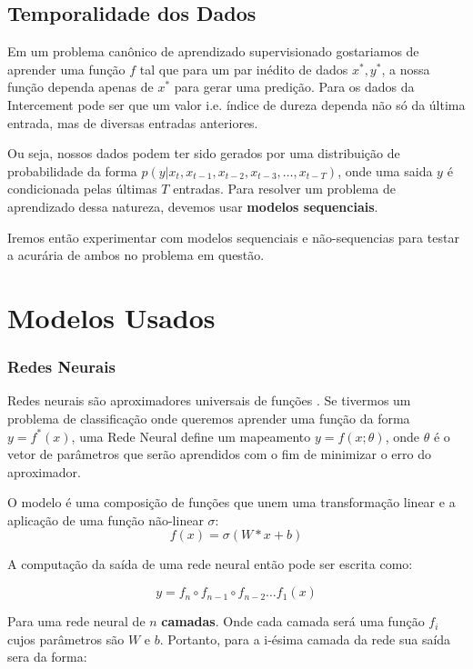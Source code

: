 
\subsection{Temporalidade dos Dados}

Em um problema canônico de aprendizado supervisionado gostariamos de aprender
uma função $f$ tal que para um par inédito de dados $x^*,y^*$, a nossa função
dependa apenas de $x^*$ para gerar uma predição. Para os dados da Intercement pode ser que um valor i.e. índice de dureza dependa não só da última entrada, mas de diversas entradas anteriores. 

Ou seja, nossos dados podem ter sido gerados por uma distribuição de probabilidade da forma $p(y | x_{t} ,x_{t -1},x_{t -2},x_{t-3} , \dots, x_{t-T})$, onde uma saida $y$ é condicionada pelas últimas $T$ entradas. Para resolver um problema de aprendizado dessa natureza, devemos usar \textbf{modelos sequenciais}. 

Iremos então experimentar com modelos sequenciais e não-sequencias para testar a acurária de ambos no problema em questão.


\section{Modelos Usados} 

\subsubsection{Redes Neurais}


Redes neurais são aproximadores universais de funções \citep{nnuni}. Se tivermos um problema
de classificação onde queremos aprender uma função da forma $y = f^*(x)$, uma
Rede Neural define um mapeamento $y = f(x ; \theta)$, onde $\theta$ é o vetor de
parâmetros que serão aprendidos com o fim de minimizar o erro do aproximador.

O modelo é uma composição de funções que unem uma transformação linear e
a aplicação de uma função não-linear $\sigma$: \\

\[ f(x)=  \sigma(W*x + b) \]

A computação da saída de uma rede neural então pode ser escrita como:

\[   y = f_n \circ f_{n-1} \circ f_{n-2} \dots f_1(x)  \]

Para uma rede neural de $n$ \textbf{camadas}. Onde cada camada será uma função
$f_i$ cujos parâmetros são $W$ e $b$. Portanto, para a i-ésima camada da rede
sua saída sera da forma: 

